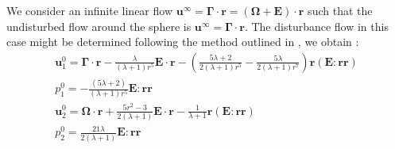 We consider an infinite linear flow $\textbf{u}^\infty = \bm\Gamma\cdot \textbf{r} =(\bm\Omega + \textbf{E})\cdot \textbf{r} $ such that the undisturbed flow around the sphere is $\textbf{u}^\infty = \bm\Gamma\cdot\textbf{r}$.
The disturbance flow in this case might be determined following the method outlined in \citep{leal2007advanced}, we obtain  :
\begin{align*}
    \textbf{u}^0_1
    = \bm\Gamma\cdot\textbf{r}
    -\frac{\lambda}{(\lambda + 1)r^5} \textbf{E}\cdot\textbf{r}
    - \left(\frac{5\lambda +2}{2(\lambda +1 )r^5} - \frac{5\lambda}{2(\lambda+1)r^7}\right) \textbf{r}(\textbf{E}:\textbf{rr})\\
    p_1^0 
    = -\frac{(5\lambda+2)}{(\lambda+1)r^5}\textbf{E}:\textbf{rr}\\
    \textbf{u}^0_2
    = \bm\Omega\cdot\textbf{r}
    + \frac{5r^2- 3}{2(\lambda + 1)} 
    \textbf{E}\cdot\textbf{r}
    -\frac{1}{\lambda+1} \textbf{r}(\textbf{E}:\textbf{rr})\\
    p_2^0 
    = \frac{21\lambda}{2(\lambda+1)}
    \textbf{E}:\textbf{rr}
\end{align*}

